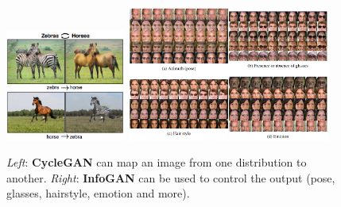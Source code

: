 \begin{figure}
    \centering
    \includegraphics[width=0.35\textwidth]{images/gan/cyclegan.png}
    \includegraphics[width=0.6\textwidth]{images/gan/infogan.png}
    \caption{\textit{Left}: \textbf{CycleGAN} can map an image from one distribution to another. \textit{Right}: \textbf{InfoGAN} can be used to control the output (pose, glasses, hairstyle, emotion and more).}
\end{figure}


